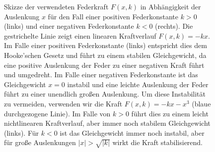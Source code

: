 \documentclass[10pt]{scrartcl}
\begin{document}
\begin{figure}[htb!]
    \centering
    \caption{Skizze der verwendeten Federkraft $F(x,k)$ in
    Abhängigkeit der Auslenkung $x$ für den Fall einer positiven
    Federkonstante $k>0$ (links) und einer negativen Federkonstante $k<0$
    (rechts). Die gestrichelte Linie zeigt einen linearen Kraftverlauf
    $F(x,k) = -kx$.  Im Falle einer positiven Federkonstante (links)
    entspricht dies dem Hooke'schen Gesetz und führt zu einem stabilen
    Gleichgewicht, da eine positive Auslenkung der Feder zu einer
    negativen Kraft führt und umgedreht. Im Falle einer negativen
    Federkonstante ist das Gleichgewicht $x=0$ instabil und eine leichte
    Auslenkung der Feder führt zu einer unendlich großen Auslenkung. Um
    diese Instabilität zu vermeiden, verwenden wir die Kraft $F(x,k) = -kx -
    x^3$ (blaue durchgezogene Linie). Im Falle von $k>0$ führt dies zu
    einem leicht nichtlinearen Kraftverlauf, aber immer noch stabilem
    Gleichgewicht (links). Für $k<0$ ist das Gleichgewicht immer noch
    instabil, aber für große Auslenkungen $|x| > \sqrt{|k|}$ wirkt die
    Kraft stabilisierend.}
    \label{fig:force}
\end{figure}
\end{document}
